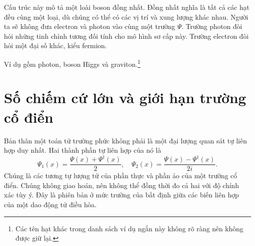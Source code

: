 Cấu trúc này mô tả một loài boson đồng nhất. Đồng nhất nghĩa là tất cả các hạt đều cùng một loại, dù chúng có thể có các vị trí và xung lượng khác nhau. Người ta sẽ không đưa electron và photon vào cùng một trường \(\Psi\). Trường photon đòi hỏi những tinh chỉnh tương đối tính cho mô hình sơ cấp này. Trường electron đòi hỏi một đại số khác, kiểu fermion.

\begin{classroomqa}
\end{classroomqa}


Ví dụ gồm photon, boson Higgs và graviton.\footnote{Các tên hạt khác trong danh sách ví dụ ngắn này không rõ ràng nên không được giữ lại.}

\section{Số chiếm cứ lớn và giới hạn trường cổ điển}

Bản thân một toán tử trường phức không phải là một đại lượng quan sát tự liên hợp duy nhất. Hai thành phần tự liên hợp của nó là
\begin{equation}
\Psi_1(x)=\frac{\Psi(x)+\Psi^\dagger(x)}{2},
\quad
\Psi_2(x)=\frac{\Psi(x)-\Psi^\dagger(x)}{2i}.
\end{equation}
Chúng là các tương tự lượng tử của phần thực và phần ảo của một trường cổ điển. Chúng không giao hoán, nên không thể đồng thời đo cả hai với độ chính xác tùy ý. Đây là phiên bản ở mức trường của bất định giữa các biến liên hợp của một dao động tử điều hòa.

